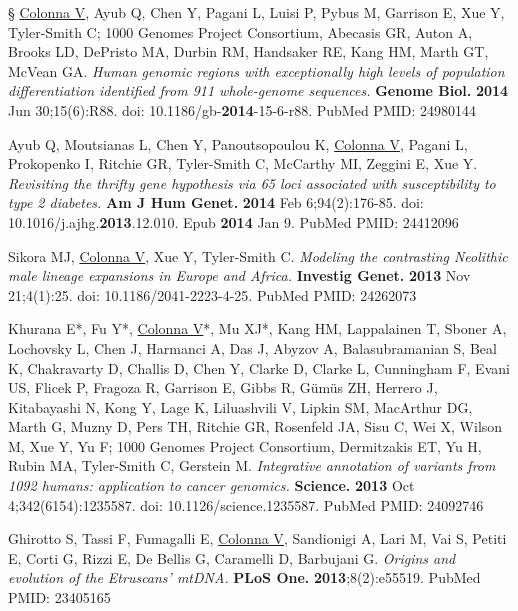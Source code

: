 \documentclass[openany]{book}
\begin{document}
\begin{enumerate}
    {\color{blue}\item § \underline{Colonna V}, Ayub Q, Chen Y, Pagani L, Luisi P, Pybus M, Garrison E, Xue Y, Tyler-Smith C; 1000 Genomes Project Consortium, Abecasis GR, Auton A, Brooks LD, DePristo MA, Durbin RM, Handsaker RE, Kang HM, Marth GT, McVean GA. \textit{Human genomic regions with exceptionally high levels of population differentiation identified from 911 whole-genome sequences.}\textbf{ Genome Biol.} \textbf{2014} Jun 30;15(6):R88. doi: 10.1186/gb-\textbf{2014}-15-6-r88. PubMed PMID: 24980144}

    \item Ayub Q, Moutsianas L, Chen Y, Panoutsopoulou K, \underline{Colonna V}, Pagani L, Prokopenko I, Ritchie GR, Tyler-Smith C, McCarthy MI, Zeggini E, Xue Y. \textit{Revisiting the thrifty gene hypothesis via 65 loci associated with susceptibility to type 2 diabetes.}\textbf{ Am J Hum Genet.} \textbf{2014} Feb 6;94(2):176-85. doi: 10.1016/j.ajhg.\textbf{2013}.12.010. Epub \textbf{2014} Jan 9. PubMed PMID: 24412096


    \item Sikora MJ, \underline{Colonna V}, Xue Y, Tyler-Smith C. \textit{Modeling the contrasting Neolithic male lineage expansions in Europe and Africa.} \textbf{  Investig Genet.} \textbf{2013} Nov 21;4(1):25. doi: 10.1186/2041-2223-4-25. PubMed PMID: 24262073

    {\color{blue}\item Khurana E*, Fu Y*, \underline{Colonna V}*, Mu XJ*, Kang HM, Lappalainen T, Sboner A, Lochovsky L, Chen J, Harmanci A, Das J, Abyzov A, Balasubramanian S, Beal K, Chakravarty D, Challis D, Chen Y, Clarke D, Clarke L, Cunningham F, Evani US, Flicek P, Fragoza R, Garrison E, Gibbs R, Gümüs ZH, Herrero J, Kitabayashi N, Kong Y, Lage K, Liluashvili V, Lipkin SM, MacArthur DG, Marth G, Muzny D, Pers TH, Ritchie GR, Rosenfeld JA, Sisu C, Wei X, Wilson M, Xue Y, Yu F; 1000 Genomes Project Consortium, Dermitzakis ET, Yu H, Rubin MA, Tyler-Smith C, Gerstein M. \textit{Integrative annotation of variants from 1092 humans: application to cancer genomics.}\textbf{ Science. }\textbf{2013} Oct 4;342(6154):1235587. doi: 10.1126/science.1235587. PubMed PMID: 24092746}  

    \item Ghirotto S, Tassi F, Fumagalli E, \underline{Colonna V}, Sandionigi A, Lari M, Vai S, Petiti E, Corti G, Rizzi E, De Bellis G, Caramelli D, Barbujani G. \textit{Origins and evolution of the Etruscans' mtDNA.}\textbf{ PLoS One.} \textbf{2013};8(2):e55519. PubMed PMID: 23405165


\end{enumerate}
\end{document}
